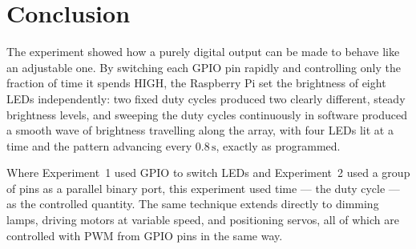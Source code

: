 \documentclass[10pt,a4paper]{article}
\begin{document}
\section{Conclusion}

The experiment showed how a purely digital output can be made to behave like an
adjustable one. By switching each GPIO pin rapidly and controlling only the fraction of
time it spends HIGH, the Raspberry Pi set the brightness of eight LEDs independently:
two fixed duty cycles produced two clearly different, steady brightness levels, and
sweeping the duty cycles continuously in software produced a smooth wave of brightness
travelling along the array, with four LEDs lit at a time and the pattern advancing every
$0.8\,\mathrm{s}$, exactly as programmed.

Where Experiment~1 used GPIO to switch LEDs and Experiment~2 used a group of pins as a
parallel binary port, this experiment used time --- the duty cycle --- as the controlled
quantity. The same technique extends directly to dimming lamps, driving motors at
variable speed, and positioning servos, all of which are controlled with PWM from GPIO
pins in the same way.
\end{document}
